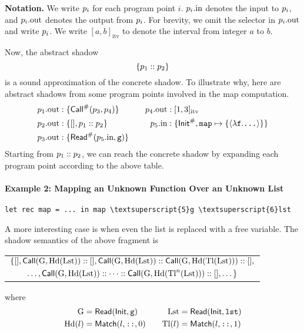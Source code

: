 \documentclass{article}
\begin{document}
\vspace{\topsep}
\noindent\textbf{Notation.}
We write $p_i$ for each program point $i$.
$p_i.\text{in}$ denotes the input to $p_i$, and $p_i.\text{out}$
denotes the output from $p_i$.
For brevity, we omit the selector in $p_i.\text{out}$ and write $p_i$.
We write $[a,b]_{\text{itv}}$ to denote the interval from integer $a$ to $b$.

\vspace{\topsep}
Now, the abstract shadow
\[\{p_1:: p_2\}\]
is a sound approximation of the concrete shadow. To illustrate why,
here are abstract shadows from some program points involved in the map computation.
\begin{align*}
  p_1.\text{out}:\{ & {\mathsf{Call}}^{\#}(p_3,p_4)\}            &  &  & p_4.\text{out}: & \;[1,3]_{\text{itv}}                                                                 \\
  p_2.\text{out}:\{ & [],p_1:: p_2\}                &  &  & p_5.\text{in}:  & \;\{{\mathsf{Init}}^{\#},\texttt{map}\mapsto\{\langle\lambda\texttt{f}.\texttt{...}\rangle\}\} \\
  p_3.\text{out}:\{ & {\mathsf{Read}}^{\#}(p_5.\text{in},\texttt{g})\}
\end{align*}
Starting from $p_1::p_2$, we can reach the concrete shadow by
expanding each program point according to the above table.

\paragraph{Example 2: Mapping an Unknown Function Over an Unknown List}
\begin{center}
  \begin{BVerbatim}[commandchars=\\\{\}]
let rec map = ... in map \textsuperscript{5}g \textsuperscript{6}lst
  \end{BVerbatim}
\end{center}
A more interesting case is when even the list is replaced with a free variable.
The shadow semantics of the above fragment is
\begin{center}
  \begin{tabular}{c}
    $\{[],\mathsf{Call}(\text{G},\textnormal{Hd}(\text{Lst}))::[],\mathsf{Call}(\text{G},\textnormal{Hd}(\text{Lst}))::\mathsf{Call}(\text{G},\textnormal{Hd}(\textnormal{Tl}(\text{Lst})))::[],$ \\
    [4pt]
    $\dots,\mathsf{Call}(\text{G},\textnormal{Hd}(\text{Lst}))::\cdots::\mathsf{Call}(\text{G},\textnormal{Hd}(\textnormal{Tl}^{n}(\text{Lst})))::[],\dots\}$
  \end{tabular}
\end{center}
where
\begin{align*}
  \text{G} & =\mathsf{Read}(\mathsf{Init},\texttt{g})       &  &  & \text{Lst} & =\mathsf{Read}(\mathsf{Init},\texttt{lst})     \\
  \textnormal{Hd}(l)   & =\textsf{Match}(l,\texttt{::},0) &  &  & \textnormal{Tl}(l)     & =\textsf{Match}(l,\texttt{::},1)
\end{align*}
\end{document}
